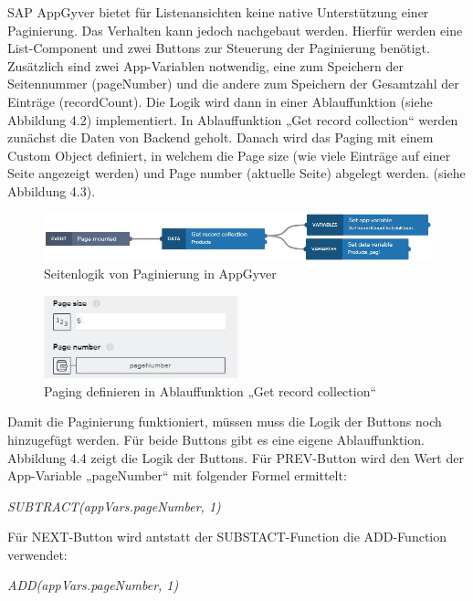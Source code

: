 SAP AppGyver bietet für Listenansichten keine native Unterstützung einer Paginierung. Das Verhalten kann jedoch nachgebaut werden. Hierfür werden eine List-Component und zwei Buttons zur Steuerung der Paginierung benötigt. Zusätzlich sind zwei App-Variablen notwendig, eine zum Speichern der Seitennummer (pageNumber) und die andere zum Speichern der Gesamtzahl der Einträge (recordCount). Die Logik wird dann in einer Ablauffunktion (siehe Abbildung 4.2) implementiert. In Ablauffunktion „Get record collection“ werden zunächst die Daten von Backend geholt. Danach wird das Paging mit einem Custom Object definiert, in welchem die Page size (wie viele Einträge auf einer Seite angezeigt werden) und Page number  (aktuelle Seite) abgelegt werden. (siehe Abbildung 4.3).

\begin{figure}[htbp]
 \centering
 \includegraphics[width=1.0\textwidth]{Bilder/appgyver/4_2_Seitenlogic paginierung.jpg}
 \caption{Seitenlogik von Paginierung in AppGyver}
\end{figure}
 
\begin{figure}[htbp]
 \centering
 \includegraphics[width=0.5\textwidth]{Bilder/appgyver/4_3_Paging_definieren.jpg}
 \caption{Paging definieren in Ablauffunktion „Get record collection“}
\end{figure}

Damit die Paginierung funktioniert, müssen muss die Logik der Buttons noch hinzugefügt werden. Für beide Buttons gibt es eine eigene Ablauffunktion. Abbildung 4.4 zeigt die Logik der Buttons. Für PREV-Button wird den Wert der App-Variable „pageNumber“ mit folgender Formel ermittelt: 

\textit{\footnotesize SUBTRACT(appVars.pageNumber, 1)} 

Für NEXT-Button wird antstatt der SUBSTACT-Function die ADD-Function verwendet: 

\textit{\footnotesize ADD(appVars.pageNumber, 1)}

